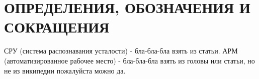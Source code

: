 \section*{ОПРЕДЕЛЕНИЯ, ОБОЗНАЧЕНИЯ И СОКРАЩЕНИЯ}

СРУ (система распознавания усталости) - бла-бла-бла взять из статьи.
АРМ (автоматизированное рабочее место) - бла-бла-бла взять из головы или статьи, но не из википедии пожалуйста можно да.

\pagebreak